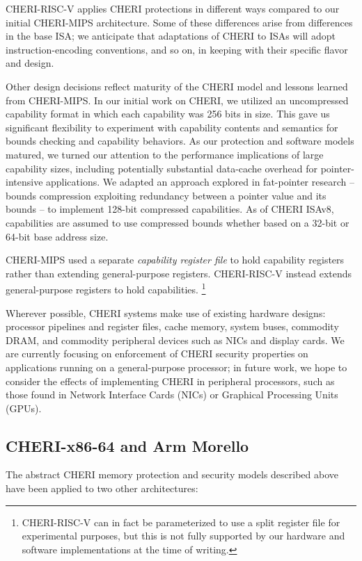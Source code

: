CHERI-RISC-V applies CHERI protections in different ways compared to
our initial CHERI-MIPS architecture.  Some of these differences arise
from differences in the base ISA; we anticipate that
adaptations of CHERI to ISAs will adopt instruction-encoding
conventions, and so on,
in keeping with their specific flavor and design.

Other design decisions reflect maturity of the CHERI model and lessons
learned from CHERI-MIPS.
In our initial work on CHERI, we utilized an uncompressed capability format
in which each capability was 256 bits in size.
This gave us significant flexibility to experiment with capability contents
and semantics for bounds checking and capability behaviors.
As our protection and software models matured, we turned our attention to the
performance implications of large capability sizes, including potentially
substantial data-cache overhead for pointer-intensive applications.
We adapted an approach explored in fat-pointer research -- bounds compression
exploiting redundancy between a pointer value and its bounds -- to implement
128-bit compressed capabilities.
As of CHERI ISAv8, capabilities are assumed to use compressed bounds whether
based on a 32-bit or 64-bit base address size.

CHERI-MIPS used a separate \textit{capability register file} to hold
capability registers rather than extending general-purpose registers.
CHERI-RISC-V instead extends general-purpose registers to hold
capabilities. \footnote{CHERI-RISC-V can in fact be parameterized to
  use a split register file for experimental purposes, but this is
  not fully supported by our hardware and software implementations at
  the time of writing.}

Wherever possible, CHERI systems make use of existing hardware designs: processor pipelines and register files, cache memory,
system buses, commodity DRAM, and commodity peripheral devices such as
NICs and display cards.
We are currently focusing on enforcement of CHERI security properties on applications
running on a general-purpose processor; in future work, we hope to consider the effects of
implementing CHERI in peripheral processors, such as those found in Network Interface Cards (NICs) or Graphical Processing Units (GPUs).

\subsection{CHERI-x86-64 and Arm Morello}

The abstract CHERI memory protection and security models described above have
been applied to two other architectures:

